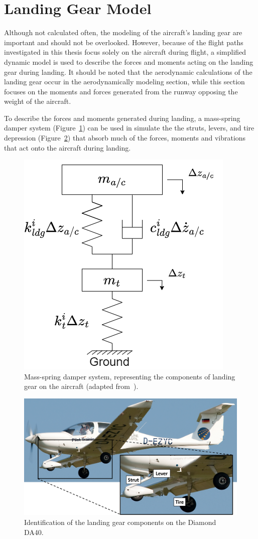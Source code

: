 \section{\textbf{Landing Gear Model}}
Although not calculated often, the modeling of the aircraft's landing gear are important and should not be overlooked. However, because of the flight paths investigated in this thesis focus solely on the aircraft during flight, a simplified dynamic model is used to describe the forces and moments acting on the landing gear during landing. It should be noted that the aerodynamic calculations of the landing gear occur in the aerodynamically modeling section, while this section focuses on the moments and forces generated from the runway opposing the weight of the aircraft.

To describe the forces and moments generated during landing, a mass-spring damper system (Figure~\ref{fig:ldgfbd}) can be used in simulate the the struts, levers, and tire depression (Figure~\ref{fig:ldg}) that absorb much of the forces, moments and vibrations that act onto the aircraft during landing.

\begin{figure}[!ht]\label{fig:ldgfbd}
    \centering
    \includegraphics[width=.4\linewidth]{Figures/ldgfbd.drawio.png}
    \caption{Mass-spring damper system, representing the components of landing gear on the aircraft (adapted from~\cite{xingStrengthAnalysisDiagonal2012}).}
\end{figure}

\begin{figure}[!ht]\label{fig:ldg}
    \centering
    \includegraphics[width=.75\linewidth]{Figures/LandingGear.png}
    \caption{Identification of the landing gear components on the Diamond DA40.}
\end{figure}

